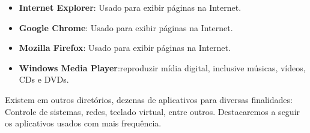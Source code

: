 \documentclass[hidelinks,12pt]{article}
\begin{document}
			\begin{itemize}
				\item{
					{\bf Internet Explorer}: Usado para exibir páginas na Internet.
			}
			
			
			
			\item{
				{\bf Google Chrome}: Usado para exibir páginas na Internet.
				}
				
				\item{
					{\bf Mozilla Firefox}: Usado para exibir páginas na Internet.
					}
					
				
				\item{
					{\bf Windows Media Player}:reproduzir mídia digital, inclusive músicas, vídeos, CDs e DVDs.
					}
			
			\end{itemize}
				
			Existem em outros diretórios, dezenas de aplicativos para diversas finalidades: Controle de sistemas, redes, teclado virtual, entre outros. Destacaremos a seguir os aplicativos usados com mais frequência.
			
\end{document}
